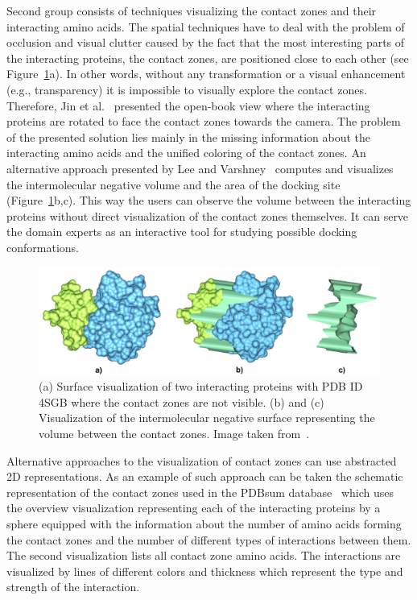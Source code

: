 \documentclass[journal]{vgtc}                %
\begin{document}
Second group consists of techniques visualizing the contact zones and their interacting amino acids.
The spatial techniques have to deal with the problem of occlusion and visual clutter caused by the fact that the most interesting parts of the interacting proteins, the contact zones, are positioned close to each other (see Figure~\ref{fig:varshney}a).
In other words, without any transformation or a visual enhancement (e.g., transparency) it is impossible to visually explore the contact zones.
Therefore, Jin et al.~\cite{Jin2014} presented the open-book view where the interacting proteins are rotated to face the contact zones towards the camera.
The problem of the presented solution lies mainly in the missing information about the interacting amino acids and the unified coloring of the contact zones.
An alternative approach presented by Lee and Varshney~\cite{Varshney2003} computes and visualizes the intermolecular negative volume and the area of the docking site (Figure~\ref{fig:varshney}b,c).
This way the users can observe the volume between the interacting proteins without direct visualization of the contact zones themselves.
It can serve the domain experts as an interactive tool for studying possible docking conformations.

\begin{figure}[tb]
  \centering
  \includegraphics[width=1.0\columnwidth]{varshney.png}
  \caption{(a) Surface visualization of two interacting proteins with PDB ID 4SGB where the contact zones are not visible. (b) and (c) Visualization of the intermolecular negative surface representing the volume between the contact zones. Image taken from~\cite{Varshney2003}.}
  \label{fig:varshney}
\end{figure}

Alternative approaches to the visualization of contact zones can use abstracted 2D representations.
As an example of such approach can be taken the schematic representation of the contact zones used in the PDBsum database~\cite{pdbsum} which uses the overview visualization representing each of the interacting proteins by a sphere equipped with the information about the number of amino acids forming the contact zones and the number of different types of interactions between them.
The second visualization lists all contact zone amino acids. 
The interactions are visualized by lines of different colors and thickness which represent the type and strength of the interaction.
\end{document}
